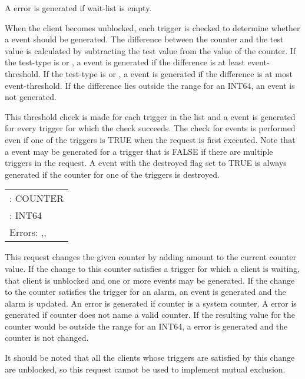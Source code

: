 \begin{description}
A  error is generated if wait-list is empty.

When the client becomes unblocked, each trigger is checked to determine
whether a  event should be generated. The difference
between the counter and the test value is calculated by
subtracting the test value from the value of the counter. If the
test-type is  or , a  event is generated if the
difference is at least event-threshold. If the test-type is
 or , a
 event is generated if the difference is at most
event-threshold. If the difference lies outside the range for an
INT64, an event is not generated.

This threshold check is made for each trigger in the list and a
 event is generated for every trigger for which
the check succeeds. The check for  events is performed
even if one of the triggers is TRUE when the request is first executed. Note
that a  event may be generated for a trigger that
is FALSE if there are multiple triggers in the request. A
 event with the destroyed flag set to TRUE is
always generated if the counter for one of the triggers is destroyed.


\begin{tabular}{l}
	\param{counter}: COUNTER\\
	\param{amount}: INT64\\[5pt]
	Errors: \error{Counter},\error{Access},\error{Value}
\end{tabular}

This request changes the given counter by adding amount to the current
counter value. If the change to this counter satisfies a trigger for which a
client is waiting, that client is unblocked and one or more
 events may be generated. If the change to the counter
satisfies the trigger for an alarm, an  event is generated
and the alarm is updated.  An  error is generated if
counter is a system counter. A  error is generated if
counter does not name a valid counter. If the resulting value for the
counter would be outside the range for an INT64, a  error is
generated and the counter is not changed.

It should be noted that all the clients whose triggers are satisfied by
this change are unblocked, so this request cannot be used to implement mutual
exclusion.


\end{description}
